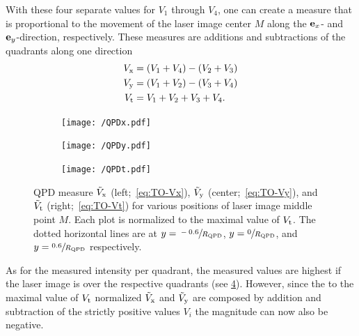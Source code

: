 With these four separate values for $V_{1}$ through $V_{4}$, one can create a 
measure that is proportional to the movement of the laser image center $M$ 
along the $\vb{e}_{x}$- and $\vb{e}_{y}$-direction, respectively. These measures are 
additions and subtractions of the quadrants along one direction
\begin{subequations}
\begin{align}
  V_{\mathrm{x}} & = \left( V_{\mathrm{1}}+V_{\mathrm{4}} \right) - \left( V_{\mathrm{2}} + 
  V_{\mathrm{3}}  \right)
  \label{eq:TO-Vx} \\
  V_{\mathrm{y}} & = \left( V_{\mathrm{1}}+V_{\mathrm{2}} \right) - \left( V_{\mathrm{3}} + 
  V_{\mathrm{4}}  \right)
  \label{eq:TO-Vy} \\
  V_{\mathrm{t}} & = V_{\mathrm{1}}+V_{\mathrm{2}} + V_{\mathrm{3}} + V_{\mathrm{4}}.
  \label{eq:TO-Vt}
\end{align}
\end{subequations}

 \begin{figure}
  \centering
  \begin{subfigure}[b]{0.36\textwidth}
    \centering
    \texttt{[image: /QPDx.pdf]}
    \label{fig:TO-QPDx}
  \end{subfigure}
  \hfill
  \begin{subfigure}[b]{0.3\textwidth}
    \centering
    \texttt{[image: /QPDy.pdf]}
    \label{fig:TO-QPDy}
  \end{subfigure}
  \hfill
  \begin{subfigure}[b]{0.3\textwidth}
    \centering
    \texttt{[image: /QPDt.pdf]}
    \label{fig:TO-QPDt}
  \end{subfigure}
  \caption{QPD measure $\tilde{V}_{\mathrm{x}}$ (left;~\cref{eq:TO-Vx}), 
    $\tilde{V}_{\mathrm{y}}$ (center;~\cref{eq:TO-Vy}), and 
    $\tilde{V}_{\mathrm{t}}$ (right;~\cref{eq:TO-Vt}) for various positions of 
    laser image middle point $M$. Each plot is normalized to the maximal value 
  of $V_{\mathrm{t}}$. The dotted horizontal lines are at 
$y=\sfrac{-0.6}{R_{\mathrm{QPD}}}$, $y=\sfrac{0}{R_{\mathrm{QPD}}}$, and 
$y=\sfrac{0.6}{R_{\mathrm{QPD}}}$ respectively.}
  \label{fig:TO-QPDs}
 \end{figure}

As for the measured intensity per quadrant, the measured values are highest if 
the laser image is over the respective quadrants (see \cref{fig:TO-QPDs}). 
However, since the to the maximal value of $V_{\mathrm{t}}$ normalized 
$\tilde{V}_{\mathrm{x}}$ and $\tilde{V}_{\mathrm{y}}$ are composed by 
addition and subtraction of the strictly positive values $V_{i}$ the magnitude 
can now also be negative.

